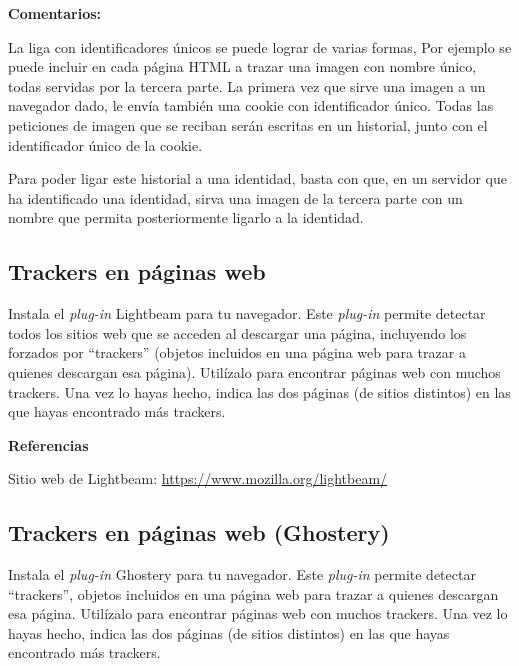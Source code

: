 \textbf{Comentarios:}

La liga con identificadores únicos se puede lograr de varias formas, Por ejemplo se puede incluir en cada página HTML a trazar una imagen con nombre único, todas servidas por la tercera parte. La primera vez que sirve una imagen a un navegador dado, le envía también una cookie con identificador único. Todas las peticiones de imagen que se reciban serán escritas en un historial, junto con el identificador único de la cookie.

Para poder ligar este historial a una identidad, basta con que, en un servidor que ha identificado una identidad, sirva una imagen de la tercera parte con un nombre que permita posteriormente ligarlo a la identidad.

\subsection{Trackers en páginas web}
\label{subsec:trackers-paginas-web}

Instala el \emph{plug-in} Lightbeam para tu navegador. Este \emph{plug-in} permite detectar todos los sitios web que se acceden al descargar una página, incluyendo los forzados por ``trackers'' (objetos incluidos en una página web para trazar a quienes descargan esa página). Utilízalo para encontrar páginas web con muchos trackers. Una vez lo hayas hecho, indica las dos páginas (de sitios distintos) en las que hayas encontrado más trackers.

\textbf{Referencias}

Sitio web de Lightbeam: \url{https://www.mozilla.org/lightbeam/}

\subsection{Trackers en páginas web (Ghostery)}
\label{subsec:trackers-paginas-web-2}

Instala el \emph{plug-in} Ghostery para tu navegador. Este \emph{plug-in} permite detectar ``trackers'', objetos incluidos en una página web para trazar a quienes descargan esa página. Utilízalo para encontrar páginas web con muchos trackers. Una vez lo hayas hecho, indica las dos páginas (de sitios distintos) en las que hayas encontrado más trackers.

